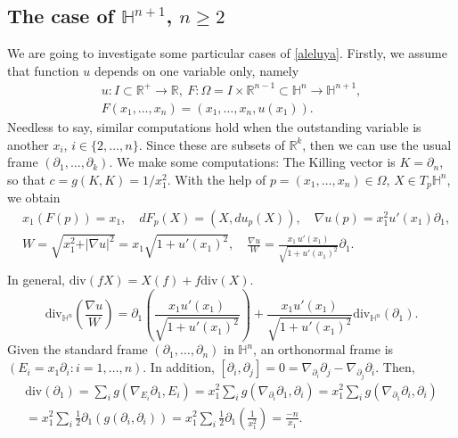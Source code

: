 \documentclass[12pt]{article}
\numberwithin{lemma}{section}
\newcommand{\R}{\mathbb{R}}
\renewcommand{\H}[1]{\mathbb{H}^{#1}}
\begin{document}
{\subsection{The case of $\mathbb{H}^{n+1}$, $n\geq 2$}

We are going to investigate some particular cases of \eqref{aleluya}. Firstly, we assume that function $u$ depends  on one variable only, namely 
\begin{gather*} u:I\subset\R^{+}\rightarrow\R, \ F:\Omega=I\times\R^{n-1}\subset\mathbb{H}^{n} \rightarrow\mathbb{H}^{n+1}, \\ 
F(x_1,\ldots,x_{n})=(x_1,\ldots,x_{n},u(x_1)).
\end{gather*}
Needless to say, similar computations hold when the outstanding variable is another $x_i$, $i\in\{2,\ldots,n\}$. Since these are subsets of $\R^k$, then we can use the usual frame $(\partial_1,\ldots,\partial_k)$. 
We make some computations: The Killing vector is $K=\partial_n$, so that $c=g(K,K)=1/x_1^2$. With the help of 	$p=(x_1,\ldots,x_{n})\in\Omega$, $X\in T_p\mathbb{H}^{n}$, we obtain 
\begin{align*}
& x_1(F(p))=x_1, \quad  
dF_p(X)=(X,du_p(X)), \quad 
\nabla u (p) = x_1^2 u'(x_1)\partial_1, \\
& W=\sqrt{x_1^2+\vert \nabla u\vert^2} = x_1\sqrt{1+u'(x_1)^2}, \quad 
\frac{\nabla u}{W}  = \frac{x_1\,u'(x_1)}{\sqrt{1+u'(x_1)^2}}\partial_1. \\
\end{align*}
In general, $\mathrm{div}(fX)=X(f)+f\mathrm{div}(X)$. 
\[
\mathrm{div}_{\H{n}}\left(\frac{\nabla u}{W} \right)  = \partial_1\left( \frac{x_1 u'(x_1)}{\sqrt{1+u'(x_1)^2}}  \right) +
\frac{x_1 u'(x_1)}{\sqrt{1+u'(x_1)^2}}  \mathrm{div}_{\H{n}}(\partial_1).
\]
Given the standard frame $(\partial_1,\ldots,\partial_{n})$ in $\mathbb{H}^{n}$, an orthonormal frame is $(E_i=x_1\partial_i :  i=1, \ldots, n)$. In addition, $[\partial_i,\partial_j]=0=\nabla_{\partial_i}\partial_j-\nabla_{\partial_j}\partial_i$. Then, 
\begin{gather*}
\mathrm{div}(\partial_1) = \sum_i g\left(\nabla_{E_i}\partial_1,E_i\right) 
=x_1^2 \sum_i g\left(\nabla_{\partial_i}\partial_1,\partial_i\right) 
=x_1^2 \sum_i g\left(\nabla_{\partial_1}\partial_i,\partial_i\right) \\
 = x_1^2\sum_i \frac12 \partial_1\left( g(\partial_i,\partial_i)\right) 
= x_1^2\sum_i \frac12 \partial_1\left( \frac{1}{x_1^2} \right) = \frac{-n}{x_1}.
\end{gather*}
}
\end{document}
